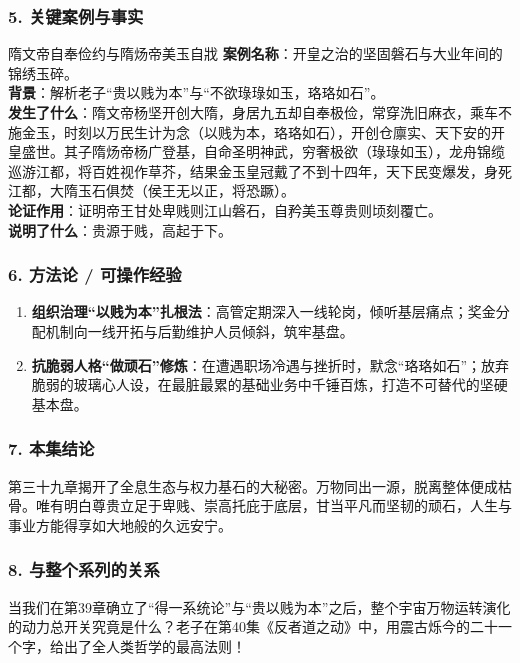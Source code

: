 \subsubsection{5. 关键案例与事实}
\begin{CaseBox}{隋文帝自奉俭约与隋炀帝美玉自戕}
\textbf{案例名称}：开皇之治的坚固磐石与大业年间的锦绣玉碎。\\
\textbf{背景}：解析老子“贵以贱为本”与“不欲琭琭如玉，珞珞如石”。\\
\textbf{发生了什么}：隋文帝杨坚开创大隋，身居九五却自奉极俭，常穿洗旧麻衣，乘车不施金玉，时刻以万民生计为念（以贱为本，珞珞如石），开创仓廪实、天下安的开皇盛世。其子隋炀帝杨广登基，自命圣明神武，穷奢极欲（琭琭如玉），龙舟锦缆巡游江都，将百姓视作草芥，结果金玉皇冠戴了不到十四年，天下民变爆发，身死江都，大隋玉石俱焚（侯王无以正，将恐蹶）。\\
\textbf{论证作用}：证明帝王甘处卑贱则江山磐石，自矜美玉尊贵则顷刻覆亡。\\
\textbf{说明了什么}：贵源于贱，高起于下。
\end{CaseBox}

\subsubsection{6. 方法论 / 可操作经验}
\begin{enumerate}
    \item \textbf{组织治理“以贱为本”扎根法}：高管定期深入一线轮岗，倾听基层痛点；奖金分配机制向一线开拓与后勤维护人员倾斜，筑牢基盘。
    \item \textbf{抗脆弱人格“做顽石”修炼}：在遭遇职场冷遇与挫折时，默念“珞珞如石”；放弃脆弱的玻璃心人设，在最脏最累的基础业务中千锤百炼，打造不可替代的坚硬基本盘。
\end{enumerate}

\subsubsection{7. 本集结论}
第三十九章揭开了全息生态与权力基石的大秘密。万物同出一源，脱离整体便成枯骨。唯有明白尊贵立足于卑贱、崇高托庇于底层，甘当平凡而坚韧的顽石，人生与事业方能得享如大地般的久远安宁。

\subsubsection{8. 与整个系列的关系}
当我们在第39章确立了“得一系统论”与“贵以贱为本”之后，整个宇宙万物运转演化的动力总开关究竟是什么？老子在第40集《反者道之动》中，用震古烁今的二十一个字，给出了全人类哲学的最高法则！

